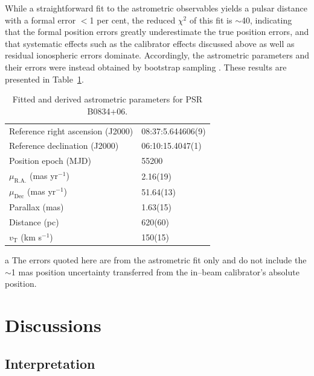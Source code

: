 \documentclass[useAMS,usenatbib]{mn2e}
\begin{document}
While a straightforward fit to the astrometric observables yields a pulsar distance with a formal error $<$1 per cent, the reduced $\chi^2$ of this fit is $\sim$40, indicating that the formal position errors greatly underestimate the true position errors, and that systematic effects such as the calibrator effects discussed above as well as residual ionospheric errors dominate.  Accordingly, the astrometric parameters and their errors were instead obtained by bootstrap sampling \citep{efron91a}.  These results are presented in Table~\ref{tab:vlbi}.

\begin{table}
\caption{Fitted and derived astrometric parameters for PSR B0834+06.}
\begin{threeparttable}
\begin{tabular}{ll}
\hline
Reference right ascension (J2000)\tnote{a}
							&  08:37:5.644606(9)\\
Reference declination (J2000)\tnote{a}
							&  06:10:15.4047(1)\\
Position epoch (MJD)			& 55200 \\
$\mu_{\mathrm{R.A.}}$ (mas yr$^{-1}$)	& 2.16(19) \\
$\mu_{\mathrm{Dec}}$	(mas yr$^{-1}$) & 51.64(13)  \\
Parallax (mas)	 				& 1.63(15) \\
Distance (pc)					& 620(60) \\
$v_{\mathrm T}$ (km s$^{-1}$)	& 150(15)\\
\hline
\end{tabular}
\begin{tablenotes}
\item[a]{The errors quoted here are from the astrometric fit only and do not include the $\sim$1 mas position uncertainty transferred from the in--beam calibrator's absolute position.}
\end{tablenotes}
\end{threeparttable}
\label{tab:vlbi}
\end{table}




\section{Discussions}
\label{sec:discussions}
\subsection{Interpretation}
\end{document}
